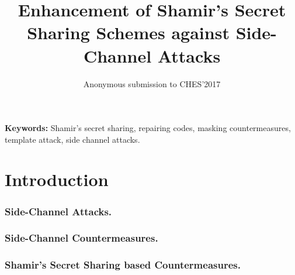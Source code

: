 \documentclass{llncs}
\title{Enhancement of Shamir's Secret Sharing Schemes against Side-Channel Attacks}
\author{Anonymous submission to CHES'2017}
\institute{}
\begin{document}
\maketitle
\begin{abstract}
 \todo{}
\end{abstract}
{\bf Keywords:} Shamir's secret sharing, repairing codes, masking countermeasures, template attack, side channel attacks.
 

\section{Introduction}
\label{sec-intro}

\subsubsection{Side-Channel Attacks.}
 \todo{}
\subsubsection{Side-Channel Countermeasures.} 
 \todo{}
\subsubsection{Shamir's Secret Sharing based Countermeasures.}
\end{document}
